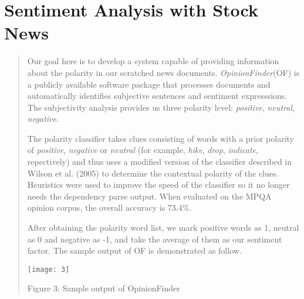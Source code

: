 \documentclass[english]{article}
\begin{document}
\section{Sentiment Analysis with Stock News}
\begin{quotation}
Our goal here is to develop a system capable of providing information
about the polarity in our scratched news documents. \emph{OpinionFinder}(OF)
is a publicly available software package that processes documents
and automatically identifies subjective sentences and sentiment expresssions.
The subjectivity analysis provides us three polarity level: \emph{positive},
\emph{neutral}, \emph{negative}. 

The polarity classifier takes clues consisting of words with a prior
polarity of \emph{positive}, \emph{negative} or \emph{neutral} (for
example,\emph{ hike}, \emph{drop}, \emph{indicate}, repectively) and
thus uses a modified version of the classifier described in Wilson
et al. (2005) to determine the contextual polarity of the clues. Heuristics
were used to improve the speed of the classifier so it no longer needs
the dependency parse output. When evaluated on the MPQA opinion corpus,
the overall accuracy is 73.4\%.

After obtaining the polarity word list, we mark positive words as
1, neutral as 0 and negative as -1, and take the average of them as
our sentiment factor. The sample output of OF is demonstrated as follow.
\begin{center}
\texttt{[image: 3]}
\par\end{center}
\begin{center}
Figure 3: Sample output of OpinionFinder
\par\end{center}
\end{quotation}
\end{document}

